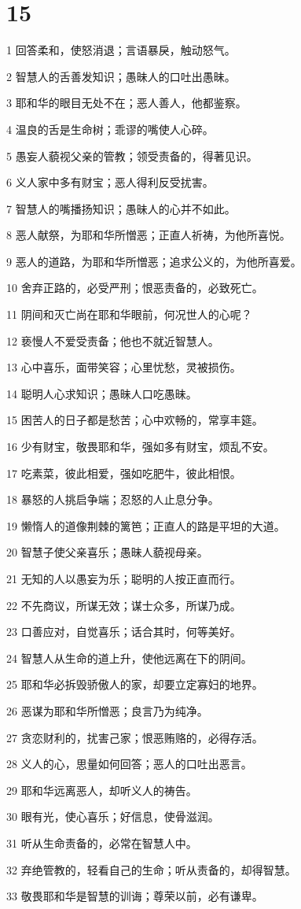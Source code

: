 \chapter{15}

\par 1 回答柔和，使怒消退；言语暴戾，触动怒气。
\par 2 智慧人的舌善发知识；愚昧人的口吐出愚昧。
\par 3 耶和华的眼目无处不在；恶人善人，他都鉴察。
\par 4 温良的舌是生命树；乖谬的嘴使人心碎。
\par 5 愚妄人藐视父亲的管教；领受责备的，得著见识。
\par 6 义人家中多有财宝；恶人得利反受扰害。
\par 7 智慧人的嘴播扬知识；愚昧人的心并不如此。
\par 8 恶人献祭，为耶和华所憎恶；正直人祈祷，为他所喜悦。
\par 9 恶人的道路，为耶和华所憎恶；追求公义的，为他所喜爱。
\par 10 舍弃正路的，必受严刑；恨恶责备的，必致死亡。
\par 11 阴间和灭亡尚在耶和华眼前，何况世人的心呢？
\par 12 亵慢人不爱受责备；他也不就近智慧人。
\par 13 心中喜乐，面带笑容；心里忧愁，灵被损伤。
\par 14 聪明人心求知识；愚昧人口吃愚昧。
\par 15 困苦人的日子都是愁苦；心中欢畅的，常享丰筵。
\par 16 少有财宝，敬畏耶和华，强如多有财宝，烦乱不安。
\par 17 吃素菜，彼此相爱，强如吃肥牛，彼此相恨。
\par 18 暴怒的人挑启争端；忍怒的人止息分争。
\par 19 懒惰人的道像荆棘的篱笆；正直人的路是平坦的大道。
\par 20 智慧子使父亲喜乐；愚昧人藐视母亲。
\par 21 无知的人以愚妄为乐；聪明的人按正直而行。
\par 22 不先商议，所谋无效；谋士众多，所谋乃成。
\par 23 口善应对，自觉喜乐；话合其时，何等美好。
\par 24 智慧人从生命的道上升，使他远离在下的阴间。
\par 25 耶和华必拆毁骄傲人的家，却要立定寡妇的地界。
\par 26 恶谋为耶和华所憎恶；良言乃为纯净。
\par 27 贪恋财利的，扰害己家；恨恶贿赂的，必得存活。
\par 28 义人的心，思量如何回答；恶人的口吐出恶言。
\par 29 耶和华远离恶人，却听义人的祷告。
\par 30 眼有光，使心喜乐；好信息，使骨滋润。
\par 31 听从生命责备的，必常在智慧人中。
\par 32 弃绝管教的，轻看自己的生命；听从责备的，却得智慧。
\par 33 敬畏耶和华是智慧的训诲；尊荣以前，必有谦卑。

